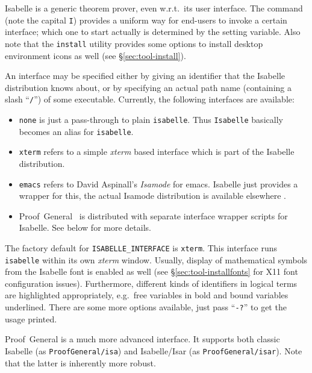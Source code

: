 Isabelle is a generic theorem prover, even w.r.t.\ its user interface.  The
 command (note the capital \texttt{I}) provides a uniform
way for end-users to invoke a certain interface; which one to start actually
is determined by the  setting variable.  Also note
that the \texttt{install} utility provides some options to install desktop
environment icons as well (see \S\ref{sec:tool-install}).

An interface may be specified either by giving an identifier that the Isabelle
distribution knows about, or by specifying an actual path name (containing a
slash ``\texttt{/}'') of some executable.  Currently, the following interfaces
are available:

\begin{itemize}
\item \texttt{none} is just a pass-through to plain \texttt{isabelle}. Thus
  \texttt{Isabelle} basically becomes an alias for \texttt{isabelle}.
  
\item \texttt{xterm} refers to a simple \textsl{xterm} based interface which
  is part of the Isabelle distribution.
  
\item \texttt{emacs} refers to David Aspinall's \emph{Isamode} for emacs.  Isabelle just provides a wrapper for this,
  the actual Isamode distribution is available elsewhere \cite{isamode}.
  
\item Proof~General~\cite{proofgeneral} is
  distributed with separate interface wrapper scripts for Isabelle.  See below
  for more details.
\end{itemize}

The factory default for \texttt{ISABELLE_INTERFACE} is \texttt{xterm}.  This
interface runs \texttt{isabelle} within its own \textsl{xterm} window.
Usually, display of mathematical symbols from the Isabelle font is enabled as
well (see \S\ref{sec:tool-installfonts} for X11 font configuration issues).
Furthermore, different kinds of identifiers in logical terms are highlighted
appropriately, e.g.\ free variables in bold and bound variables underlined.
There are some more options available, just pass ``\texttt{-?}'' to get the
usage printed.

\medskip Proof~General is a much more
advanced interface.  It supports both classic Isabelle (as
\texttt{ProofGeneral/isa}) and Isabelle/Isar (as \texttt{ProofGeneral/isar}).
Note that the latter is inherently more robust.


